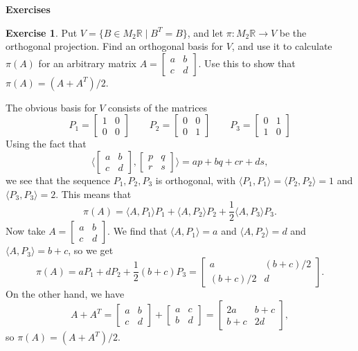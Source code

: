 \documentclass{amsart}
\newcommand{\R}         {{\mathbb{R}}}
\newcommand{\bsm}       {\left[\begin{smallmatrix}}
\newcommand{\esm}       {\end{smallmatrix}\right]}
\newcommand{\st}        {\;|\;}
\newcommand{\half}      {{\textstyle\frac{1}{2}}}
\newcommand{\ip}[1]     {\langle #1\rangle}
\renewcommand{\:}       {\colon}
\theoremstyle{definition}
\newtheorem{exercise}{Exercise}[section]
\renewenvironment{solution}{\SolutionAtEnd}{\endSolutionAtEnd}
\begin{document}
\begin{center}
 \Large \textbf{Exercises}
\end{center}

\begin{exercise}
 Put $V=\{B\in M_2\R\st B^T=B\}$, and let $\pi\:M_2\R\to V$
 be the orthogonal projection.  Find an orthogonal basis for
 $V$, and use it to calculate $\pi(A)$ for an arbitrary
 matrix $A=\bsm a&b\\ c&d\esm$.  Use this to show that
 $\pi(A)=(A+A^T)/2$. 
\end{exercise}
\begin{solution}
 The obvious basis for $V$ consists of the matrices 
 \[ P_1 = \bsm 1&0\\0&0 \esm \hspace{2em}
    P_2 = \bsm 0&0\\0&1 \esm \hspace{2em}
    P_3 = \bsm 0&1\\1&0 \esm
 \]
 Using the fact that 
 \[ \ip{\bsm a&b \\ c&d\esm, \bsm p&q \\ r&s\esm}
     = ap + bq + cr + ds,
 \]
 we see that the sequence $P_1,P_2,P_3$ is orthogonal, with
 $\ip{P_1,P_1}=\ip{P_2,P_2}=1$ and $\ip{P_3,P_3}=2$.  This
 means that 
 \[ \pi(A) = 
     \ip{A,P_1}P_1 + \ip{A,P_2}P_2 + \half\ip{A,P_3}P_3.
 \]
 Now take $A=\bsm a&b\\ c&d\esm$.  We find that
 $\ip{A,P_1}=a$ and $\ip{A,P_2}=d$ and $\ip{A,P_3}=b+c$, so
 we get 
 \[ \pi(A) = 
     a P_1 + d P_2 + \half(b+c) P_3 = 
     \bsm a & (b+c)/2 \\ (b+c)/2 & d \esm.
 \]
 On the other hand, we have 
 \[ A+A^T = \bsm a & b \\ c & d \esm + 
            \bsm a & c \\ b & d \esm 
          = \bsm 2a & b+c \\ b+c & 2d \esm,
 \]
 so $\pi(A)=(A+A^T)/2$.
\end{solution}
\end{document}
